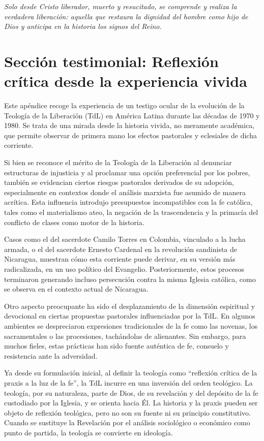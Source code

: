 \documentclass[12pt]{article}
\begin{document}
\textit{Solo desde Cristo liberador, muerto y resucitado, se comprende y realiza la verdadera liberación: aquella que restaura la dignidad del hombre como hijo de Dios y anticipa en la historia los signos del Reino.}

\appendix
\section*{Sección testimonial: Reflexión crítica desde la experiencia vivida}

Este apéndice recoge la experiencia de un testigo ocular de la evolución de la Teología de la Liberación (TdL) en América Latina durante las décadas de 1970 y 1980. Se trata de una mirada desde la historia vivida, no meramente académica, que permite observar de primera mano los efectos pastorales y eclesiales de dicha corriente.

Si bien se reconoce el mérito de la Teología de la Liberación al denunciar estructuras de injusticia y al proclamar una opción preferencial por los pobres, también se evidencian ciertos riesgos pastorales derivados de su adopción, especialmente en contextos donde el análisis marxista fue asumido de manera acrítica. Esta influencia introdujo presupuestos incompatibles con la fe católica, tales como el materialismo ateo, la negación de la trascendencia y la primacía del conflicto de clases como motor de la historia.

Casos como el del sacerdote Camilo Torres en Colombia, vinculado a la lucha armada, o el del sacerdote Ernesto Cardenal en la revolución sandinista de Nicaragua, muestran cómo esta corriente puede derivar, en su versión más radicalizada, en un uso político del Evangelio. Posteriormente, estos procesos terminaron generando incluso persecución contra la misma Iglesia católica, como se observa en el contexto actual de Nicaragua.

Otro aspecto preocupante ha sido el desplazamiento de la dimensión espiritual y devocional en ciertas propuestas pastorales influenciadas por la TdL. En algunos ambientes se despreciaron expresiones tradicionales de la fe como las novenas, los sacramentales o las procesiones, tachándolas de alienantes. Sin embargo, para muchos fieles, estas prácticas han sido fuente auténtica de fe, consuelo y resistencia ante la adversidad.

Ya desde su formulación inicial, al definir la teología como ``reflexión crítica de la praxis a la luz de la fe'', la TdL incurre en una inversión del orden teológico. La teología, por su naturaleza, parte de Dios, de su revelación y del depósito de la fe custodiado por la Iglesia, y se orienta hacia Él. La historia y la praxis pueden ser objeto de reflexión teológica, pero no son su fuente ni su principio constitutivo. Cuando se sustituye la Revelación por el análisis sociológico o económico como punto de partida, la teología se convierte en ideología.
\end{document}
